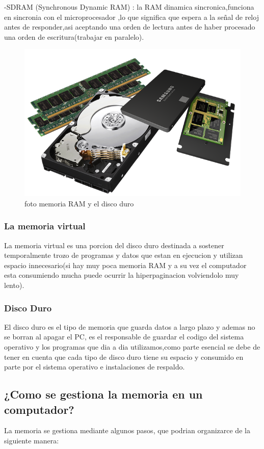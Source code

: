 \documentclass{article}
\begin{document}
            -SDRAM (Synchronous Dynamic RAM) : la RAM dinamica sincronica,funciona en sincronia con el microprocesador ,lo que significa que espera a la señal de reloj antes de responder,asi aceptando una orden de lectura antes  de haber procesado una orden de escritura(trabajar en paralelo).\cite{hardzone}
            
            \begin{figure}[h]
            \includegraphics[width=6 cm]{imagenes/ram+hdd+ssd.png}
            \centering
            \caption{foto memoria RAM y el disco duro}
            \label{fig:ram+hdd+ssd}
            \end{figure}
            
        \subsubsection{La memoria virtual}
        La memoria virtual es una porcion del disco duro destinada a sostener temporalmente trozo de programas y datos que estan en ejecucion y utilizan espacio innecesario(si hay muy poca memoria RAM y a su vez el computador esta consumiendo mucha puede ocurrir la hiperpaginacion volviendolo muy lento).

        \subsubsection{Disco Duro}
        El disco duro es el tipo de memoria que guarda datos a largo plazo y ademas no se borran al apagar el PC, es el responsable de guardar el codigo del sistema operativo y los programas que dia a dia utilizamos,como parte esencial se debe de tener en cuenta que cada tipo de disco duro tiene su espacio y consumido en parte por el sistema operativo e instalaciones de respaldo.\cite{digitaltrends}
        
        
    \subsection{¿Como se gestiona la memoria en un computador?}
    La memoria se gestiona mediante algunos pasos, que podrian organizarce de la siguiente manera:
    
\end{document}
